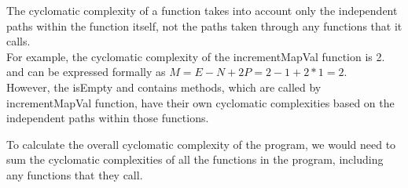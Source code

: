\documentclass[a4paper]{article}
\begin{document}
\vspace{4mm}

  

The cyclomatic complexity of a function takes into account only the independent paths within the function itself, 
not the paths taken through any functions that it calls. \\

For example, the cyclomatic complexity of the incrementMapVal function is 2.
and can be expressed formally as
$M = E - N + 2P = 2 - 1 + 2 * 1 = 2$. \\

However, the isEmpty and contains methods, which are called by incrementMapVal function,
have their own cyclomatic complexities based on the independent paths within those functions. \\


\begin{figure}[h!]
\centering
{}
\end{figure}



To calculate the overall cyclomatic complexity of the program,
we would need to sum the cyclomatic complexities of all the functions in the program, 
including any functions that they call. \\
\end{document}
